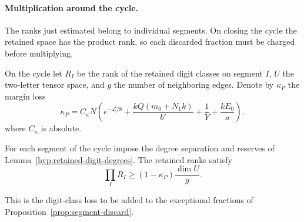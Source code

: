\paragraph{Multiplication around the cycle.}

The ranks just estimated belong to individual segments. On closing the cycle the retained space has the product rank, so each discarded fraction must be charged before multiplying.

On the cycle let \(R_I\) be the rank of the retained digit
classes on segment \(I\), \(U\) the two-letter tensor space,
and \(g\) the number of neighboring edges. Denote by
\(\kappa_P\) the margin loss
\[
 \kappa_P=C_\kappa N\left(e^{-\mathcal L/8}
   +\frac{kQ(m_0+N_1 k)}{b'}+\frac{1}{Y}+\frac{kE_0}{a}\right),
\]
where \(C_\kappa\) is absolute.

\begin{lemma}\label{lem:cycle-retained-rank}
For each segment of the cycle impose the degree separation
and reserves of Lemma~\ref{hyp:retained-digit-degrees}.
The retained ranks satisfy
\[
 \prod_I R_I\ge(1-\kappa_P)\frac{\dim U}{g}.
\]

This is the digit-class loss to be added to the exceptional
fractions of Proposition~\ref{prop:segment-discard}.
\end{lemma}

